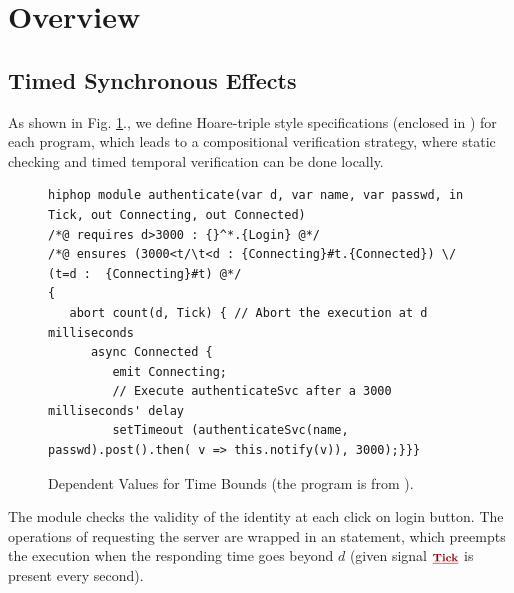 \documentclass[acmsmall,review,anonymous]{acmart}\settopmatter{printfolios=true,printccs=false,printacmref=false}
\newcommand{\anyevent}[1]{{\textcolor{darkred}
{\underline{\textbf{\footnotesize #1}}}}}
\newcommand{\code}[1]{{\tt{\ensuremath{\m{#1}}}}}
\newcommand{\m}{\mathit}
\newcommand\figref[1]{Fig. \textcolor{black}{\ref{#1}}.}
\begin{document}

%






\section{Overview}\label{sec:Overview}

\subsection{Timed Synchronous Effects}
As shown in \figref{fig:overview_eg1}, we define Hoare-triple style specifications (enclosed in \textcolor{darklavender}{}) for each program, which leads to a compositional verification strategy, where static checking and timed temporal verification can be done locally. %

\begin{figure}[h]
      \vspace{0mm}
\begin{lstlisting}[columns=fullflexible]
hiphop module authenticate(var d, var name, var passwd, in Tick, out Connecting, out Connected)
/*@ requires d>3000 : {}^*.{Login} @*/
/*@ ensures	(3000<t/\t<d : {Connecting}#t.{Connected}) \/ (t=d :  {Connecting}#t) @*/
{
   abort count(d, Tick) { // Abort the execution at d milliseconds
      async Connected {
         emit Connecting; 
         // Execute authenticateSvc after a 3000 milliseconds' delay
         setTimeout (authenticateSvc(name, passwd).post().then( v => this.notify(v)), 3000);}}}
\end{lstlisting}  
      \vspace{0mm}
      \caption{Dependent Values for Time Bounds (the program is from  \cite{berry2020hiphop}).}\label{fig:overview_eg1}
         \vspace{0mm}
\end{figure}


The {} module checks the validity of the identity at each click on login button. The operations of requesting the server are wrapped in an {\textbf{\color{purple}}} statement, which preempts the execution when the responding time goes beyond \code{\m{d}} (given signal \code{\anyevent{Tick}} is present every second).
\end{document}
